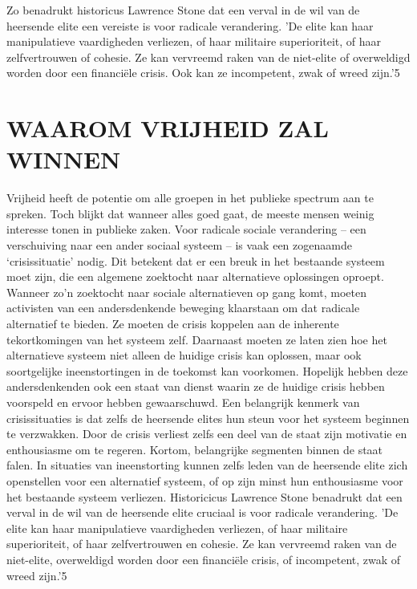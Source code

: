 \documentclass[
  a5paper,
  smalldemyvopaper,10pt,twoside,onecolumn,openright,extrafontsizes,hidelinks]{memoir}
\begin{document}
Zo benadrukt historicus Lawrence Stone dat een verval in de wil van de
heersende elite een vereiste is voor radicale verandering. 'De elite kan
haar manipulatieve vaardigheden verliezen, of haar militaire
superioriteit, of haar zelfvertrouwen of cohesie. Ze kan vervreemd raken
van de niet-elite of overweldigd worden door een financiële crisis. Ook
kan ze incompetent, zwak of wreed zijn.'5

\section{\texorpdfstring{\textbf{WAAROM VRIJHEID ZAL
WINNEN}}{WAAROM VRIJHEID ZAL WINNEN}}\label{waarom-vrijheid-zal-winnen}

Vrijheid heeft de potentie om alle groepen in het publieke spectrum aan
te spreken. Toch blijkt dat wanneer alles goed gaat, de meeste mensen
weinig interesse tonen in publieke zaken. Voor radicale sociale
verandering -- een verschuiving naar een ander sociaal systeem -- is
vaak een zogenaamde `crisissituatie' nodig. Dit betekent dat er een
breuk in het bestaande systeem moet zijn, die een algemene zoektocht
naar alternatieve oplossingen oproept. Wanneer zo'n zoektocht naar
sociale alternatieven op gang komt, moeten activisten van een
andersdenkende beweging klaarstaan om dat radicale alternatief te
bieden. Ze moeten de crisis koppelen aan de inherente tekortkomingen van
het systeem zelf. Daarnaast moeten ze laten zien hoe het alternatieve
systeem niet alleen de huidige crisis kan oplossen, maar ook
soortgelijke ineenstortingen in de toekomst kan voorkomen. Hopelijk
hebben deze andersdenkenden ook een staat van dienst waarin ze de
huidige crisis hebben voorspeld en ervoor hebben gewaarschuwd. Een
belangrijk kenmerk van crisissituaties is dat zelfs de heersende elites
hun steun voor het systeem beginnen te verzwakken. Door de crisis
verliest zelfs een deel van de staat zijn motivatie en enthousiasme om
te regeren. Kortom, belangrijke segmenten binnen de staat falen. In
situaties van ineenstorting kunnen zelfs leden van de heersende elite
zich openstellen voor een alternatief systeem, of op zijn minst hun
enthousiasme voor het bestaande systeem verliezen. Historicicus Lawrence
Stone benadrukt dat een verval in de wil van de heersende elite cruciaal
is voor radicale verandering. 'De elite kan haar manipulatieve
vaardigheden verliezen, of haar militaire superioriteit, of haar
zelfvertrouwen en cohesie. Ze kan vervreemd raken van de niet-elite,
overweldigd worden door een financiële crisis, of incompetent, zwak of
wreed zijn.'5
\end{document}
